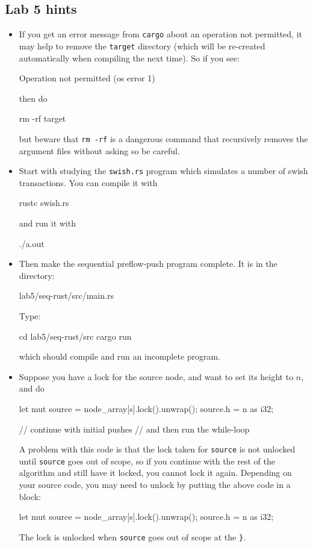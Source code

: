 \documentclass{forsete}
\begin{document}
{\begin{itemize}
\end{itemize}

\subsection*{Lab 5 hints}
\begin{itemize}
\item If you get an error message from \verb.cargo. about an operation not permitted, it may help
to remove the \verb.target. directory (which will be re-created automatically when compiling the
next time). So if you see:
\begin{ccode}
Operation not permitted (os error 1)
\end{ccode}
then do
\begin{ccode}
rm -rf target
\end{ccode}
but beware that \verb.rm -rf. is a dangerous command that recursively removes the argument files without asking so be
careful.
\item Start with studying the \verb!swish.rs! program which simulates a number of swish transactions. 
You can compile it with
\begin{ccode}
rustc swish.rs
\end{ccode}
and run it with
\begin{ccode}
./a.out
\end{ccode}
\item Then make the sequential preflow-push program complete. It is in the directory:
\begin{ccode}
lab5/seq-rust/src/main.rs
\end{ccode}
Type:
\begin{ccode}
cd lab5/seq-rust/src
cargo run
\end{ccode}
which should compile and run an incomplete program.

\item Suppose you have a lock for the source node, and want to set its height to $n$, and do
\begin{ccode}
let mut source = node_array[s].lock().unwrap();
source.h = n as i32;

// continue with initial pushes
// and then run the while-loop
\end{ccode}
A problem with this code is that the lock taken for \verb.source. is not unlocked until
\verb.source. goes out of scope, so if you continue with the rest of the algorithm and
still have it locked, you cannot lock it again. Depending on your source code, you may
need to unlock by putting the above code in a block:
\begin{ccode}
{
	let mut source = node_array[s].lock().unwrap();
	source.h = n as i32;
}
\end{ccode}
The lock is unlocked when \verb.source. goes out of scope at the \verb.}..


\end{itemize}}
\end{document}
